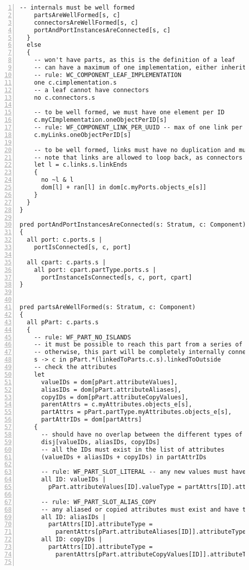 \begin{lstlisting}[caption={bb\_well\_formed.als}, numbers=left]
    -- internals must be well formed
    partsAreWellFormed[s, c]
    connectorsAreWellFormed[s, c]
    portAndPortInstancesAreConnected[s, c]
  }
  else
  {
    -- won't have parts, as this is the definition of a leaf
    -- can have a maximum of one implementation, either inherited or added, or replaced
    -- rule: WC_COMPONENT_LEAF_IMPLEMENTATION
    one c.cimplementation.s
    -- a leaf cannot have connectors
    no c.connectors.s
    
    -- to be well formed, we must have one element per ID
    c.myCImplementation.oneObjectPerID[s]
    -- rule: WF_COMPONENT_LINK_PER_UUID -- max of one link per ID
    c.myLinks.oneObjectPerID[s]    
    
    -- to be well formed, links must have no duplication and must refer to real ports in the stratum
    -- note that links are allowed to loop back, as connectors can loop back through parts...
    let l = c.links.s.linkEnds
    {
      no ~l & l
      dom[l] + ran[l] in dom[c.myPorts.objects_e[s]]
    }    
  }
}

pred portAndPortInstancesAreConnected(s: Stratum, c: Component)
{
  all port: c.ports.s |
    portIsConnected[s, c, port]
    
  all cpart: c.parts.s |
    all port: cpart.partType.ports.s |
      portInstanceIsConnected[s, c, port, cpart]
}


pred partsAreWellFormed(s: Stratum, c: Component)
{
  all pPart: c.parts.s
  {
    -- rule: WF_PART_NO_ISLANDS
    -- it must be possible to reach this part from a series of connections from the owning component
    -- otherwise, this part will be completely internally connected -- an island
    s -> c in pPart.*(linkedToParts.c.s).linkedToOutside
    -- check the attributes
    let
      valueIDs = dom[pPart.attributeValues],
      aliasIDs = dom[pPart.attributeAliases],
      copyIDs = dom[pPart.attributeCopyValues],
      parentAttrs = c.myAttributes.objects_e[s],
      partAttrs = pPart.partType.myAttributes.objects_e[s],
      partAttrIDs = dom[partAttrs]
    {
      -- should have no overlap between the different types of possibilities
      disj[valueIDs, aliasIDs, copyIDs]
      -- all the IDs must exist in the list of attributes
      (valueIDs + aliasIDs + copyIDs) in partAttrIDs

      -- rule: WF_PART_SLOT_LITERAL -- any new values must have the correct type
      all ID: valueIDs |
        pPart.attributeValues[ID].valueType = partAttrs[ID].attributeType

      -- rule: WF_PART_SLOT_ALIAS_COPY
      -- any aliased or copied attributes must exist and have the correct type
      all ID: aliasIDs |
        partAttrs[ID].attributeType =
          parentAttrs[pPart.attributeAliases[ID]].attributeType
      all ID: copyIDs |
        partAttrs[ID].attributeType =
          parentAttrs[pPart.attributeCopyValues[ID]].attributeType
        

\end{lstlisting}
